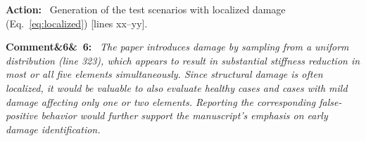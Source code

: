 \documentclass[11pt]{article}
\newenvironment{rcomment}[1]{\par\bigskip\noindent\textbf{Comment\ifx&#1&\else\ #1\fi:}\ \itshape}{\par}
\newenvironment{action}{\par\smallskip\noindent\color{resp}\textbf{Action:}\ }{\par}
\newcommand{\tbd}[1]{\textcolor{note}{\textsf{[#1]}}}
\newcommand{\lines}[1]{\tbd{lines #1}}
\begin{document}
\begin{action}
Generation of the test scenarios with localized damage (Eq.~\eqref{eq:localized}) \lines{xx--yy}.
\end{action}

\begin{rcomment}{6}
The paper introduces damage by sampling from a uniform distribution (line 323), which appears to result in substantial
stiffness reduction in most or all five elements simultaneously. Since structural damage is often localized, it would be
valuable to also evaluate healthy cases and cases with mild damage affecting only one or two elements. Reporting the
corresponding false-positive behavior would further support the manuscript's emphasis on early damage identification.
\end{rcomment}
\end{document}
